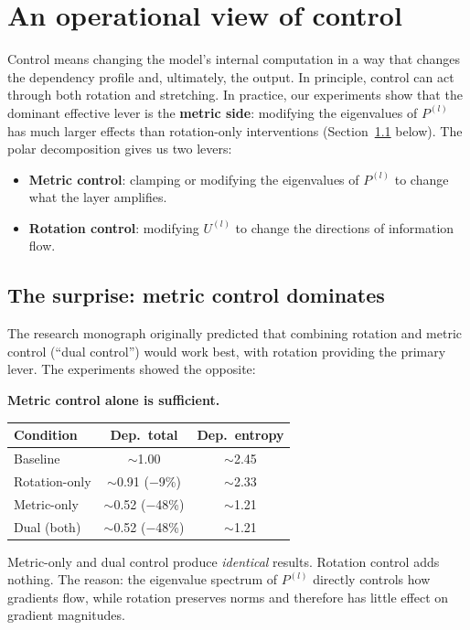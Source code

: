 \documentclass[11pt, twoside, openright]{memoir}
\begin{document}
\section{An operational view of control}

Control means changing the model's internal computation in a way that
changes the dependency profile and, ultimately, the output. In principle,
control can act through both rotation and stretching. In practice, our
experiments show that the dominant effective lever is the \textbf{metric
side}: modifying the eigenvalues of $P^{(l)}$ has much larger effects than
rotation-only interventions (Section~\ref{sec:metric-dominates} below).
The polar decomposition gives us two levers:

\begin{itemize}[nosep]
\item \textbf{Metric control}: clamping or modifying the eigenvalues
  of $P^{(l)}$ to change what the layer amplifies.
\item \textbf{Rotation control}: modifying $U^{(l)}$ to change the
  directions of information flow.
\end{itemize}

\subsection{The surprise: metric control dominates}
\label{sec:metric-dominates}

The research monograph originally predicted that combining rotation and
metric control (``dual control'') would work best, with rotation providing
the primary lever. The experiments showed the opposite:

\begin{finding}
\textbf{Metric control alone is sufficient.}

\begin{center}
\renewcommand{\arraystretch}{1.3}\small
\begin{tabular}{@{}lcc@{}}
\toprule
\textbf{Condition} & \textbf{Dep.\ total} & \textbf{Dep.\ entropy} \\
\midrule
Baseline & $\sim$1.00 & $\sim$2.45 \\
Rotation-only & $\sim$0.91 ($-$9\%) & $\sim$2.33 \\
Metric-only & $\sim$0.52 ($-$48\%) & $\sim$1.21 \\
Dual (both) & $\sim$0.52 ($-$48\%) & $\sim$1.21 \\
\bottomrule
\end{tabular}
\end{center}

Metric-only and dual control produce \emph{identical} results. Rotation
control adds nothing. The reason: the eigenvalue spectrum of $P^{(l)}$
directly controls how gradients flow, while rotation preserves norms and
therefore has little effect on gradient magnitudes.
\end{finding}
\end{document}
